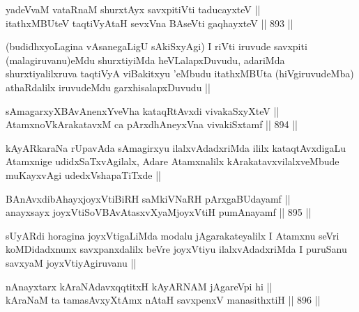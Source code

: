 
\begin{shl}
yadeVvaM vataRnaM shurxtAyx savxpitiVti taducayxteV || \\
itathxMBUteV taqtiVyA\s taH sevxVna BAseVti gaqhayxteV ||  893 ||  
\end{shl}

\begin{artha}
(budidhxyoLagina vAsanegaLigU sAkiSxyAgi) I riVti iruvude savxpiti (malagiruvanu)eMdu shurxtiyiMda heVLalapxDuvudu, adariMda shurxtiyalilxruva taqtiVyA viBakitxyu \stext'eMbudu itathxMBUta (hiVgiruvudeMba) athaRdalilx iruvudeMdu garxhisalapxDuvudu ||
\end{artha}


\begin{shl}
sAmagarxyXBAvAnenxYveVha kataqRtAvxdi vivakaSxyXteV || \\
AtamxnoV\s kArakatavxM ca pArxdhAneyxVna vivakiSxtamf ||  894 ||  
\end{shl}

\begin{artha}
kAyARkaraNa rUpavAda sAmagirxyu ilalxvAdadxriMda ililx kataqtAvxdigaLu Atamxnige udidxSaTxvAgilalx, Adare Atamxnalilx kArakatavxvilalxveMbude muKayxvAgi udedxVshapaTiTxde ||
\end{artha}


\begin{shl}
BAnAvxdibAhayxjoyxVtiBiRH saMkiVNaRH pArxgaBUdayamf || \\
anayxsayx joyxVtiSoV\s BAvAtasxvXyaMjoyxVtiH pumAnayamf ||  895 ||  
\end{shl}

\begin{artha}
sUyARdi horagina joyxVtigaLiMda modalu jAgarakateyalilx I Atamxnu seVri koMDidadxnunx savxpanxdalilx beVre joyxVtiyu ilalxvAdadxriMda I puruSanu savxyaM joyxVtiyAgiruvanu || 
\end{artha}


\begin{shl}
nAnayxtarx kAraNAdavxqqtitxH kAyARNAM jAgareV\s pi hi || \\
kAraNaM ta tamasAvxyXtAmx nAtaH savxpenxV manasithxtiH ||  896 ||  
\end{shl}

